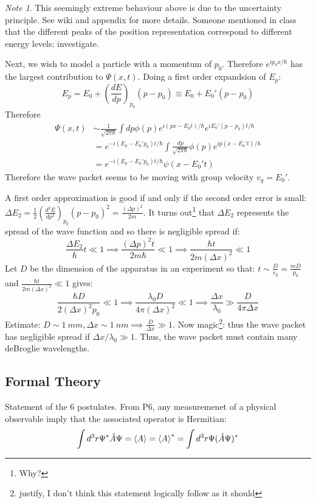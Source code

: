 \documentclass[11pt]{article}
\newcommand{\FR}[2]{\frac{#1}{#2}}
\newcommand{\LL}{\left}
\newcommand{\RR}{\right}
\theoremstyle{plain}
\theoremstyle{definition}
\theoremstyle{remark}
\newtheorem*{note}{Note}
\begin{document}
\begin{note}
This seemingly extreme behaviour above is due to the uncertainty principle.
See wiki and appendix for more details. Someone mentioned in class that the
different peaks of the position representation correspond to different energy
levels; investigate.
\end{note}

Next, we wish to model a particle with a momentum of $p_0$.
Therefore $e^{ip_0 x/\hbar}$ has the largest contribution to $\Psi(x,t)$.
Doing a first order expandsion of $E_p$:
\[ E_p = E_0 + \LL(\FR{dE}{dp}\RR)_{p_0}(p-p_0) \equiv
E_0 + E_0'(p-p_0)\]
Therefore
\begin{align*}
\Psi(x,t) &\sim \FR{1}{\sqrt{2\pi\hbar}} \int dp
\phi(p) e^{i(px-E_0t)/\hbar} e^{iE_0'(p-p_0)t/\hbar}\\
          &= e^{-i(E_0-E_0'p_0)t/\hbar}
             \int \FR{dp}{\sqrt{2\pi\hbar}} \phi(p) e^{ip(x-E_0't)/\hbar}\\
          &= e^{-i(E_0-E_0'p_0)t/\hbar} \psi(x-E_0't)
\end{align*}
Therefore the wave packet seems to be moving with group velocity $v_g = E_0'$.

A first order approximation is good if and only if the second order error is 
small: $\Delta E_2 = \FR{1}{2}\LL(\FR{d^2 E}{dp^2}\RR)_{p_0}(p-p_0)^2
= \FR{(\Delta p)^2}{2m}$. It turns out\footnote{Why?} that $\Delta E_2$
represents the spread of the wave function and so there is negligible spread
if:
\[ \FR{\Delta E_2}{\hbar} t \ll 1 \implies
   \FR{(\Delta p)^2 t}{2m\hbar} \ll 1 \implies
   \FR{\hbar t}{2m(\Delta x)^2} \ll 1\]
Let $D$ be the dimension of the apparatus in an experiment so that:
$t \sim \FR{D}{v_g} = \FR{mD}{p_0}$ and $\FR{\hbar t}{2m(\Delta x)^2} \ll 1$
gives:
\[ \FR{\hbar D}{2(\Delta x)^2p_0} \ll 1 \implies \FR{\lambda_0 D}{4\pi(\Delta x)^2} \ll 1
    \implies \FR{\Delta x}{\lambda_0} \gg \FR{D}{4\pi\Delta x}\]
Estimate: $D\sim \SI{1}{mm}, \Delta x \sim \SI{1}{nm} \implies \FR{D}{\Delta x} \gg 1$.
Now magic\footnote{justify, I don't think this statement logically follow as it should}:
thus the wave packet has negligible spread if $\Delta x/\lambda_0 \gg 1$. Thus,
the wave packet must contain many deBroglie wavelengths.

\subsection{Formal Theory}
Statement of the 6 postulates.
From P6, any measuremenet of a physical observable imply that the associated
operator is Hermitian:
\[ \int d^3 r \Psi^* \hat A \Psi = \mathinner{\langle{A}\rangle} = \mathinner{\langle{A}\rangle}^*
 = \int d^3 r \Psi (\hat A \Psi)^* \]
\end{document}
